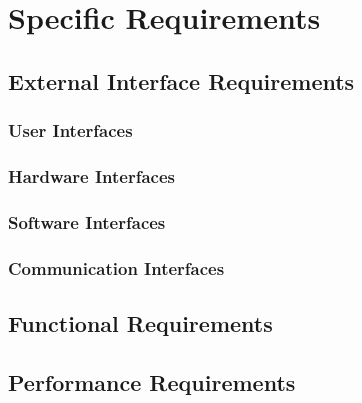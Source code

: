 \section{Specific Requirements}

\subsection{External Interface Requirements}

\subsubsection{User Interfaces}

\subsubsection{Hardware Interfaces}

\subsubsection{Software Interfaces}

\subsubsection{Communication Interfaces}

\subsection{Functional Requirements}

\subsection{Performance Requirements}

